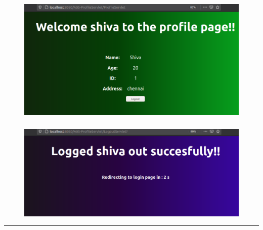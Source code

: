 \documentclass[12pt,letterpaper]{article}
\begin{document}
\subsubsection*{}
\begin{figure}[h!]
    \centering
    \includegraphics[width = \textwidth]{Pics/op3.png}
\end{figure}
\subsubsection*{}
\begin{figure}[h!]
    \centering
    \includegraphics[width = \textwidth]{Pics/op4.png}
\end{figure}

\hrule
\end{document}

